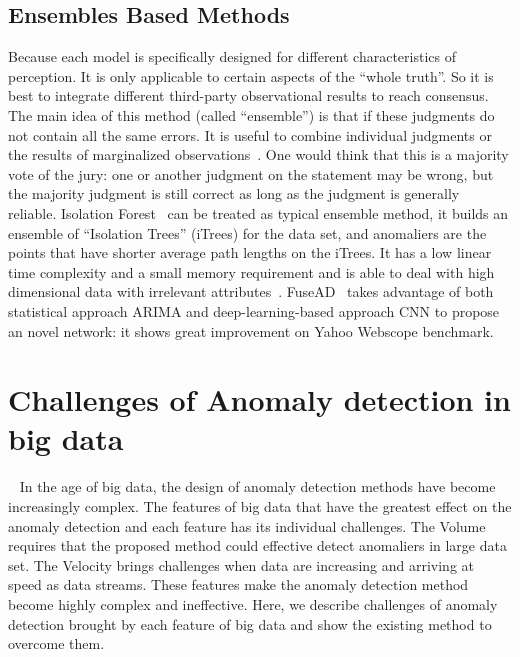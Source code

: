 \subsection{Ensembles Based Methods}

Because each model is specifically designed
for different characteristics of perception.
It is only applicable to certain aspects of
the ``whole truth''.
So it is best to integrate different
third-party observational results to reach consensus.
The main idea of this method (called ``ensemble'')
is that if these judgments do not contain
all the same errors.
It is useful to combine individual judgments or
the results of marginalized observations~\cite{zhou2012ensemble}.
One would think that this is a majority vote of
the jury:
one or another judgment on the statement may be wrong,
but the majority judgment is still correct as long as
the judgment is generally reliable.
Isolation Forest~\cite{liu2008isolation}
can be treated as typical ensemble method,
it builds an ensemble of “Isolation Trees” (iTrees) for
the data set,
and anomaliers are the points that
have shorter average path lengths on the iTrees.
It has a low linear time complexity and
a small memory requirement
and is able to deal with high dimensional data 
with irrelevant attributes~\cite{chandola2009anomaly}.
FuseAD~\cite{munir2019fusead}
takes advantage of both statistical approach ARIMA
and deep-learning-based approach
CNN to propose an novel network:
it shows great improvement on Yahoo Webscope benchmark.

\section{Challenges of Anomaly detection in big data}
~\label{sec-challenge-big}
In the age of big data,
the design of anomaly detection methods have become increasingly complex.
The features of big data that have the greatest effect
on the anomaly detection and each 
feature has its individual challenges.
The Volume requires that 
the proposed method could effective detect anomaliers in large data set.
The Velocity brings challenges when data are increasing 
and arriving at speed as data streams.
These features make the anomaly detection method 
become highly complex and ineffective.
Here, 
we describe challenges of anomaly detection brought 
by each feature of big data and 
show the existing method to overcome them.

